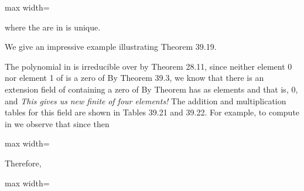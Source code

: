 \documentclass[11pt,oneside]{article}
\begin{document}
\begin{BookBody}
\begin{center}\begin{adjustbox}{max width=\linewidth}\end{adjustbox}\end{center}

\noindent where the  are in  is unique. \BookEnd{\blacklozenge}

\noindent We give an impressive example illustrating Theorem 39.19.

 The polynomial  in  is irreducible over  by Theorem 28.11, since neither element 0 nor element 1 of  is a zero of  By Theorem 39.3, we know that there is an extension field  of  containing a zero \BookInline{\alpha } of  By Theorem  has as elements  and  that is, 0,  and  \textit{This gives us}  \textit{new finite}  \textit{of four elements!} The addition and multiplication tables for this field are shown in Tables 39.21 and 39.22. For example, to compute  in  we observe that since  then

\begin{center}\begin{adjustbox}{max width=\linewidth}\end{adjustbox}\end{center}

\noindent Therefore,

\begin{center}\begin{adjustbox}{max width=\linewidth}\end{adjustbox}\end{center} \BookEnd{\blacktriangle}


\end{BookBody}
\end{document}
